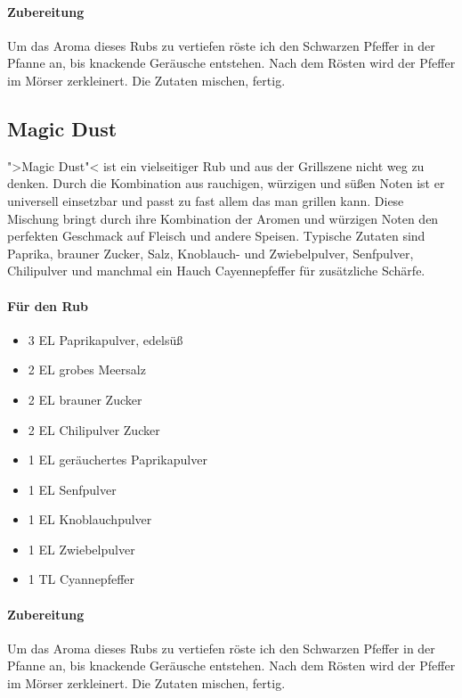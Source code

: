 \paragraph{Zubereitung}

Um das Aroma dieses Rubs zu vertiefen röste ich den Schwarzen Pfeffer in der 
Pfanne an, bis 
knackende Geräusche entstehen. Nach dem Rösten wird der Pfeffer im Mörser 
zerkleinert. Die Zutaten mischen, fertig.

\subsection{Magic Dust}\label{Magic}

">Magic Dust"< ist ein vielseitiger Rub  und aus der Grillszene nicht weg zu 
denken. Durch die Kombination aus rauchigen, würzigen und süßen Noten ist 
er universell einsetzbar und passt zu fast allem das man grillen kann. Diese 
Mischung bringt durch ihre Kombination der Aromen und würzigen Noten den 
perfekten Geschmack auf Fleisch und andere Speisen. Typische Zutaten sind 
Paprika, brauner Zucker, Salz, Knoblauch- und Zwiebelpulver, Senfpulver, 
Chilipulver und manchmal ein Hauch Cayennepfeffer für zusätzliche Schärfe.

\paragraph{Für den Rub}

\begin{itemize}[noitemsep]
	\item 3 EL Paprikapulver, edelsüß
	\item 2 EL grobes Meersalz
	\item 2 EL brauner Zucker
	\item 2 EL Chilipulver Zucker
	\item 1 EL geräuchertes Paprikapulver
	\item 1 EL Senfpulver
	\item 1 EL Knoblauchpulver
	\item 1 EL Zwiebelpulver
	\item 1 TL Cyannepfeffer
\end{itemize}

\paragraph{Zubereitung}

Um das Aroma dieses Rubs zu vertiefen röste ich den Schwarzen Pfeffer in der 
Pfanne an, bis 
knackende Geräusche entstehen. Nach dem Rösten wird der Pfeffer im Mörser 
zerkleinert. Die Zutaten mischen, fertig.

